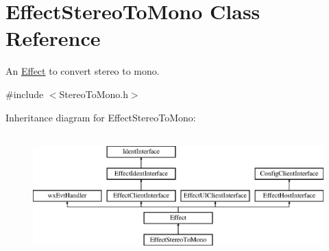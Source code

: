 \hypertarget{class_effect_stereo_to_mono}{}\section{Effect\+Stereo\+To\+Mono Class Reference}
\label{class_effect_stereo_to_mono}


An \hyperlink{class_effect}{Effect} to convert stereo to mono.  




{\ttfamily \#include $<$Stereo\+To\+Mono.\+h$>$}

Inheritance diagram for Effect\+Stereo\+To\+Mono\+:\begin{figure}[H]
\begin{center}
\leavevmode
\includegraphics[height=4.794520cm]{class_effect_stereo_to_mono}
\end{center}
\end{figure}
